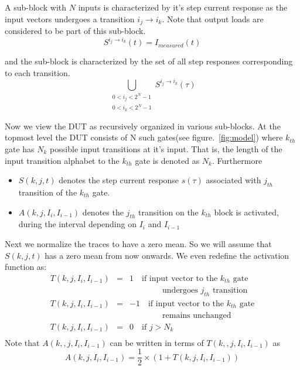 \documentclass[a4]{IEEEtran}
\begin{document}
A sub-block with $N$ inputs is characterized by it's step current response as the input vectors undergoes a transition $i_j\rightarrow i_{k}$. Note that output loads
are considered to be part of this sub-block.
\begin{equation}
S^{i_j\rightarrow i_{k}}(t)= I_{measured}(t)
\end{equation}

and the sub-block is characterized by the set of all step responses corresponding to each transition.
\begin{displaymath}
\bigcup_{\substack{0<i_j<2^N-1 \\ 0<i_k<2^N-1}} S^{i_j\rightarrow i_{k}}(\tau)
\end{displaymath}


Now we view the DUT as recursively organized in various sub-blocks. At the topmost level the DUT consists of N such gates(see figure.~\ref{fig:model}) 
where $k_{th}$ gate has $N_k$ possible input transitions at it's input. That is, the length of the input transition alphabet to the $k_{th}$ gate is 
denoted as $N_k$. Furthermore 
\begin{itemize}
\item
$S(k,j,t)$ denotes the step current response $s(\tau)$ associated with $j_{th}$ 
transition of the $k_{th}$ gate. 
\item
$A(k,j,I_i,I_{i-1})$ denotes the $j_{th}$ transition on the $k_{th}$ block is activated, during the interval depending on $I_i$ and $I_{i-1}$
\end{itemize}

Next we normalize the traces to have a zero mean. So we will assume that $S(k,j,t)$ has a zero mean from now onwards.
We even redefine the activation function as:
\small
\begin{eqnarray*}
T(k,j,I_i,I_{i-1}) & = & 1 \quad\textrm{if input vector to the $k_{th}$ gate}{}
		\\
		& & {}\qquad\qquad \textrm{undergoes $j_{th}$ transition}\\
T(k,j,I_i,I_{i-1}) & = & -1 \quad\textrm{if input vector to the $k_{th}$ gate}{}
		\\
		& & {}\qquad\qquad \textrm{remains unchanged}\\
T(k,j,I_i,I_{i-1}) & = & 0 \quad \textrm{if $j> N_k$}\\
\end{eqnarray*}
\normalsize
Note that $A(k,,j,I_i,I_{i-1})$ can be written in terms of $T(k,,j,I_i,I_{i-1})$ as 
\begin{equation}
A(k,j,I_i,I_{i-1})=\frac{1}{2} \times (1+T(k,j,I_i,I_{i-1}))
\end{equation}
\end{document}
